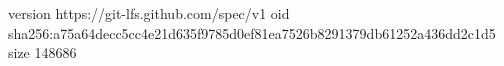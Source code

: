 version https://git-lfs.github.com/spec/v1
oid sha256:a75a64decc5cc4e21d635f9785d0ef81ea7526b8291379db61252a436dd2c1d5
size 148686

